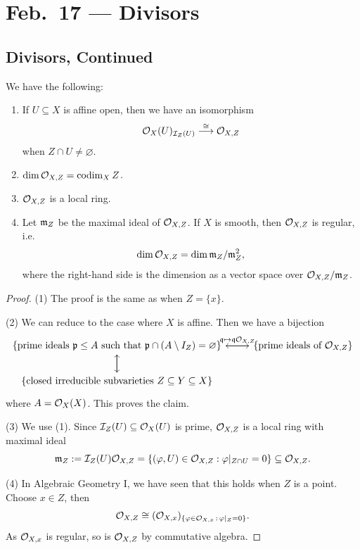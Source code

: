 \chapter{Feb.~17 --- Divisors}

\section{Divisors, Continued}
\begin{prop}
   We have the following:
   \begin{enumerate}
     \item If $U \subseteq X$ is affine open,
       then
       we have an isomorphism
       \[
         \mathcal{O}_X(U)_{\mathcal{I}_Z(U)}
         \overset{\cong}{\longrightarrow}
         \mathcal{O}_{X, Z}
       \]
       when $Z \cap U \ne \varnothing$.
     \item $\dim \mathcal{O}_{X, Z} = \operatorname{codim}_X Z$.
     \item $\mathcal{O}_{X, Z}$ is a local ring.
     \item Let $\mathfrak{m}_Z$ be the maximal
       ideal of $\mathcal{O}_{X, Z}$.
       If $X$ is smooth, then
       $\mathcal{O}_{X, Z}$ is regular, i.e.
       \[
         \dim \mathcal{O}_{X, Z}
         = \dim \mathfrak{m}_Z / \mathfrak{m}_Z^2,
       \]
       where the right-hand side is the
       dimension as a vector space over
       $\mathcal{O}_{X, Z} / \mathfrak{m}_Z$.
   \end{enumerate}
\end{prop}

\begin{proof}
  (1) The proof is the same as when
  $Z = \{x\}$.

  (2) We can reduce to the case where
  $X$ is affine. Then we have a bijection
  \[
    \begin{tikzcd}
      \{\text{prime ideals $\p \le A$ such that $\p \cap (A \setminus I_Z) = \varnothing$}\} \ar[d]
    \ar[r, "\q \mapsto \q \OO_{X, Z}"]
    &
    \{\text{prime ideals of $\OO_{X, Z}$}\} \ar[l] \\
    \{\text{closed irreducible subvarieties $Z \subseteq Y \subseteq X$}\} \ar[u]
    \end{tikzcd}
  \]
  where $A = \mathcal{O}_X(X)$.
  This proves the claim.

  (3) We use (1). Since
  $\mathcal{I}_Z(U) \subseteq \mathcal{O}_X(U)$
  is prime, $\mathcal{O}_{X, Z}$ is a local
  ring with maximal ideal
  \[
    \mathfrak{m}_Z := \mathcal{I}_Z(U) \mathcal{O}_{X, Z}
    = \{(\varphi, U) \in \mathcal{O}_{X, Z} : \varphi|_{Z \cap U} = 0\} \subseteq \mathcal{O}_{X, Z}.
  \]

  (4) In Algebraic Geometry I, we have
  seen that this holds when $Z$ is a point.
  Choose $x \in Z$, then
  \[
    \mathcal{O}_{X, Z} \cong (\mathcal{O}_{X, x})_{\{\varphi \in \mathcal{O}_{X, x}\, :\, \varphi|_Z = 0\}}.
  \]
  As $\mathcal{O}_{X, x}$ is regular, so is
  $\mathcal{O}_{X, Z}$ by commutative algebra.
\end{proof}

